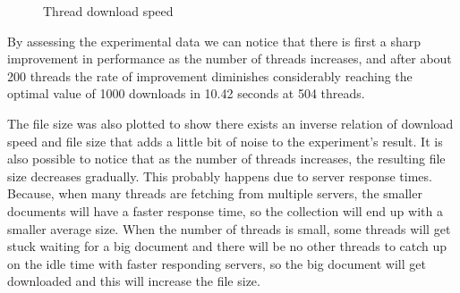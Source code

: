\documentclass{report}
\begin{document}
\begin{figure}
\centering
{}
\label{fig:threadspeed}
\caption{Thread download speed} 
\end{figure}

By assessing the experimental data we can notice that there is first a sharp improvement in performance as
the number of threads increases, and after about 200 threads the rate of improvement diminishes considerably
reaching the optimal value of 1000 downloads in 10.42 seconds at 504 threads. 

The file size was also plotted to show there exists an inverse relation of download speed and file size that
adds a little bit of noise to the experiment's result. It is also possible to notice that as the number of
threads increases, the resulting file size decreases gradually. This probably happens due to server response 
times. Because, when many threads are fetching from multiple servers,
the smaller documents will have a faster response time, so the collection will end up with a smaller average size.
When the number of threads is small, some threads will get stuck waiting for a big document and there will be no
other threads to catch up on the idle time with faster responding servers, so the big document will get downloaded
and this will increase the file size.
\end{document}
